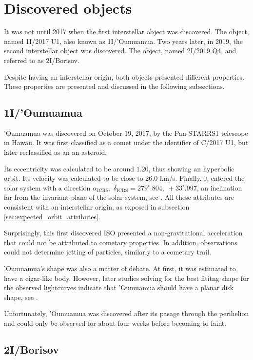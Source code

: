 \section{Discovered objects}

It was not until 2017 when the first interstellar object was discovered. The
object, named 1I/2017 U1, also known as 1I/'Oumuamua. Two years later, in 2019,
the second interstellar object was discovered. The object, named 2I/2019 Q4, and
referred to as 2I/Borisov. 

Despite having an interstellar origin, both objects presented different
properties. These properties are presented and discussed in the following
subsections.

\subsection{1I/'Oumuamua}

'Oumuamua was discovered on October 19, 2017, by the Pan-STARRS1 telescope in
Hawaii. It was first classified as a comet under the identifier of C/2017 U1,
but later reclassified as an an asteroid.

Its eccentricity was calculated to be around $1.20$, thus showing an hyperbolic
orbit. Its velocity was calculated to be close to $26.0$ km/s. Finally, it
entered the solar system with a direction $\alpha_{\text{ICRS}},\;
\delta_{\text{ICRS}} = 279^\circ.804,\; +33^\circ.997$, an inclination far from
the invariant plane of the solar system, see \cite{mamajek2017}. All these
attributes are consistent with an interstellar origin, as exposed in subsection
\ref{sec:expected_orbit_attributes}.

Surprisingly, this first discovered ISO presented a non-gravitational
acceleration that could not be attributed to cometary properties. In addition,
observations could not determine jetting of particles, similarly to a cometary
trail.

'Oumuamua's shape was also a matter of debate. At first, it was estimated to
have a cigar-like body. However, later studies solving for the best fititng
shape for the observed lightcurves indicate that 'Oumuamua should have a
planar disk shape, see \cite{seligman2022}.

Unfortunately, 'Oumuamua was discovered after its pasage through the perihelion
and could only be observed for about four weeks before becoming to faint.


\subsection{2I/Borisov}

